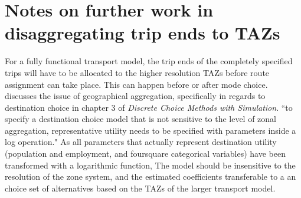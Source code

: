 \section{Notes on further work in disaggregating trip ends to TAZs}
For a fully functional transport model, the trip ends of the completely specified trips will have to be allocated to the higher resolution TAZs before route assignment can take place. This can happen before or after mode choice. \textcite{Train2009} discusses the issue of geographical aggregation, specifically in regards to destination choice in chapter 3 of \textit{Discrete Choice Methods with Simulation}. 
``to specify a destination choice model that is not sensitive to the level of zonal aggregation, representative utility needs to be specified with parameters inside a log operation."
As all parameters that actually represent destination utility (population and employment, and foursquare categorical variables) have been transformed with a logarithmic function, The model should be insensitive to the resolution of the zone system, and the estimated coefficients transferable to a an choice set of alternatives based on the TAZs of the larger transport model.
